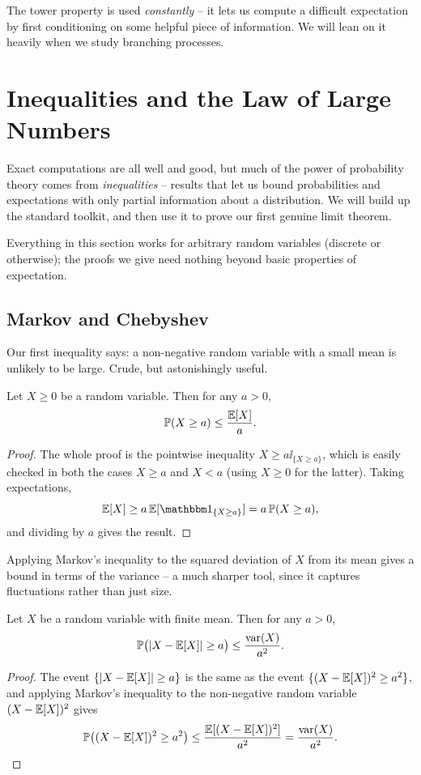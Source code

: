\documentclass[a4paper]{scrartcl}
\begin{document}
The tower property is used \emph{constantly} -- it lets us compute a difficult expectation by first conditioning on some helpful piece of information. We will lean on it heavily when we study branching processes.


\section{Inequalities and the Law of Large Numbers}

Exact computations are all well and good, but much of the power of probability theory comes from \emph{inequalities} -- results that let us bound probabilities and expectations with only partial information about a distribution. We will build up the standard toolkit, and then use it to prove our first genuine limit theorem.

Everything in this section works for arbitrary random variables (discrete or otherwise); the proofs we give need nothing beyond basic properties of expectation.

\subsection{Markov and Chebyshev}

Our first inequality says: a non-negative random variable with a small mean is unlikely to be large. Crude, but astonishingly useful.

\begin{theorem}
	Let $X \geq 0$ be a random variable. Then for any $a > 0$,
	$$
	\mathbb{P}(X \geq a) \leq \frac{\mathbb{E}[X]}{a}.
	$$
\end{theorem}
\begin{proof}
	The whole proof is the pointwise inequality $X \geq a \ii_{\{X \geq a\}}$, which is easily checked in both the cases $X \geq a$ and $X < a$ (using $X \geq 0$ for the latter). Taking expectations,
	$$
	\EE[X] \geq a \, \EE[\ii_{\{X \geq a\}}] = a\,\PP(X \geq a),
	$$
	and dividing by $a$ gives the result.
\end{proof}

Applying Markov's inequality to the squared deviation of $X$ from its mean gives a bound in terms of the variance -- a much sharper tool, since it captures fluctuations rather than just size.

\begin{theorem}
	Let $X$ be a random variable with finite mean. Then for any $a > 0$,
	$$
	\mathbb{P}\big(|X - \mathbb{E}[X]| \geq a\big) \leq \frac{\operatorname{var}(X)}{a^2}.
	$$
\end{theorem}
\begin{proof}
	The event $\{|X - \mathbb{E}[X]| \geq a\}$ is the same as the event $\{(X - \mathbb{E}[X])^2 \geq a^2\}$, and applying Markov's inequality to the non-negative random variable $(X - \mathbb{E}[X])^2$ gives
	$$
	\mathbb{P}\big((X - \mathbb{E}[X])^2 \geq a^2\big) \leq \frac{\mathbb{E}[(X - \mathbb{E}[X])^2]}{a^2} = \frac{\operatorname{var}(X)}{a^2}. \qedhere
	$$
\end{proof}
\end{document}
